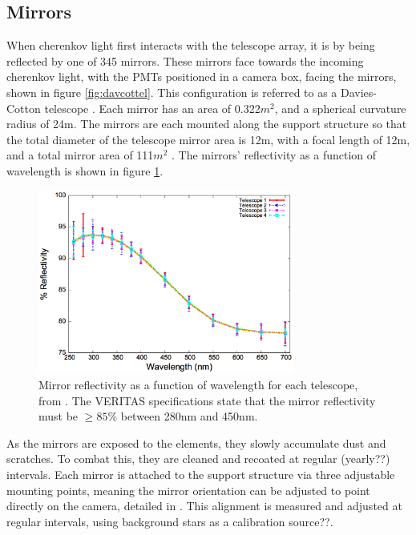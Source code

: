 \subsection{Mirrors}


When cherenkov light first interacts with the telescope array, it is by being reflected by one of 345 mirrors.
These mirrors face towards the incoming cherenkov light, with the PMTs positioned in a camera box, facing the mirrors, shown in figure \ref{fig:davcottel}.
This configuration is referred to as a Davies-Cotton telescope \cite{daviescotton}.
Each mirror has an area of 0.322$m^2$, and a spherical curvature radius of 24m.
The mirrors are each mounted along the support structure so that the total diameter of the telescope mirror area is 12m, with a focal length of 12m, and a total mirror area of 111$m^2$ \cite{Veritas_Detector}.
The mirrors' reflectivity as a function of wavelength is shown in figure \ref{fig:mirreflect}.

\begin{figure}[h]
  \begin{center}
    \includegraphics[width=0.75\textwidth]{images/mirror_reflect}
    \caption[Mirror Reflectivity]{Mirror reflectivity as a function of wavelength for each telescope, from \cite{mirrorfacets}.  The VERITAS specifications state that the mirror reflectivity must be $\geq 85\%$ between 280nm and 450nm.}\label{fig:mirreflect}
  \end{center}
\end{figure}

As the mirrors are exposed to the elements, they slowly accumulate dust and scratches.
To combat this, they are cleaned and recoated at regular (yearly??) intervals.
Each mirror is attached to the support structure via three adjustable mounting points, meaning the mirror orientation can be adjusted to point directly on the camera, detailed in \cite{mirroralign}.
This alignment is measured and adjusted at regular intervals, using background stars as a calibration source??.


